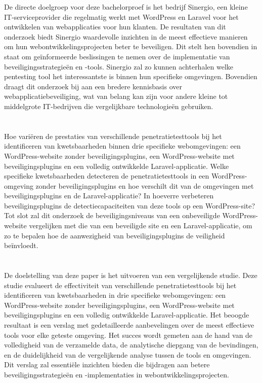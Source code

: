 De directe doelgroep voor deze bachelorproef is het bedrijf Sinergio, een kleine IT-serviceprovider die regelmatig 
werkt met WordPress en Laravel voor het ontwikkelen van webapplicaties voor hun klanten. De resultaten van dit 
onderzoek biedt Sinergio waardevolle inzichten in de meest effectieve manieren om hun webontwikkelingsprojecten beter 
te beveiligen. Dit stelt hen bovendien in staat om geïnformeerde beslissingen te nemen over de implementatie van 
beveiligingsstrategieën en -tools. Sinergio zal zo kunnen achterhalen welke pentesting tool het interessantste is binnen hun specifieke omgevingen.
Bovendien draagt dit onderzoek bij aan een bredere kennisbasis over webapplicatiebeveiliging, 
wat van belang kan zijn voor andere kleine tot middelgrote IT-bedrijven die vergelijkbare technologieën gebruiken.

\section{}%
\label{sec:onderzoeksvraag}
Hoe variëren de prestaties van verschillende penetratietesttools bij het identificeren van kwetsbaarheden binnen drie 
specifieke webomgevingen: een WordPress-website zonder beveiligingsplugins, een WordPress-website met beveiligingsplugins 
en een volledig ontwikkelde Laravel-applicatie. Welke specifieke kwetsbaarheden detecteren de penetratietesttools in een WordPress-omgeving zonder 
beveiligingsplugins en hoe verschilt dit van de omgevingen met beveiligingsplugins en de Laravel-applicatie? 
In hoeverre verbeteren beveiligingsplugins de detectiecapaciteiten van deze tools op een WordPress-site? 
Tot slot zal dit onderzoek de beveiligingsniveaus van een onbeveiligde WordPress-website vergelijken met die 
van een beveiligde site en een Laravel-applicatie, om zo te bepalen hoe de aanwezigheid van beveiligingsplugins de 
veiligheid beïnvloedt.

\section{}%
\label{sec:onderzoeksdoelstelling}
De doelstelling van deze paper is het uitvoeren van een vergelijkende studie. Deze studie evalueert de effectiviteit van 
verschillende penetratietesttools bij het identificeren van kwetsbaarheden in drie specifieke webomgevingen: een WordPress-website 
zonder beveiligingsplugins, een WordPress-website met beveiligingsplugins en een volledig ontwikkelde Laravel-applicatie.
Het beoogde resultaat is een verslag met gedetailleerde aanbevelingen over de meest effectieve tools voor elke geteste 
omgeving. Het succes wordt gemeten aan de hand van de volledigheid van de verzamelde data, de analytische diepgang van de bevindingen, 
en de duidelijkheid van de vergelijkende analyse tussen de tools en omgevingen. Dit verslag zal essentiële inzichten bieden die 
bijdragen aan betere beveiligingsstrategieën en -implementaties in webontwikkelingsprojecten.
